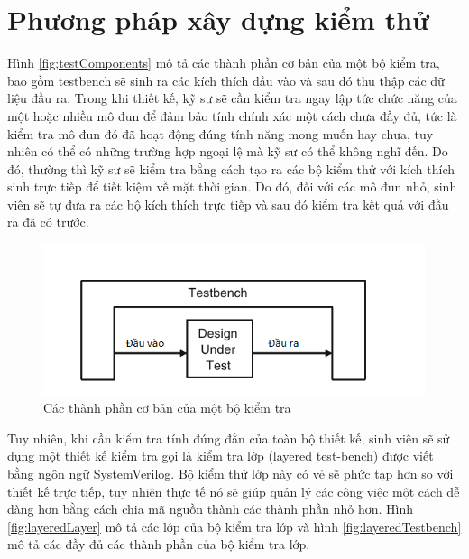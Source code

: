 \section{Phương pháp xây dựng kiểm thử}
Hình \ref{fig;testComponents} mô tả các thành phần cơ bản của một bộ kiểm tra, bao gồm testbench sẽ sinh ra các kích thích đầu vào và sau đó thu thập các dữ liệu đầu ra.
Trong khi thiết kế, kỹ sư sẽ cần kiểm tra ngay lập tức chức năng của một hoặc nhiều mô đun để đảm bảo tính chính xác một cách chưa đầy đủ, tức là kiểm tra mô đun đó đã hoạt động đúng tính năng mong muốn hay chưa, tuy nhiên có thể có những trường hợp ngoại lệ mà kỹ sư có thể không nghĩ đến. Do đó, thường thì kỹ sư sẽ kiểm tra bằng cách tạo ra các bộ kiểm thử với kích thích sinh trực tiếp để tiết kiệm về mặt thời gian. Do đó, đối với các mô đun nhỏ, sinh viên sẽ tự đưa ra các bộ kích thích trực tiếp và sau đó kiểm tra kết quả với đầu ra đã có trước. 

\begin{figure}[!ht]
	\centering
	\includegraphics[width=\linewidth]{figures/testComponents.png}
	\caption{Các thành phần cơ bản của một bộ kiểm tra}
	\label{fig:testComponents}
\end{figure}

Tuy nhiên, khi cần kiểm tra tính đúng đắn của toàn bộ thiết kế, sinh viên sẽ sử dụng một thiết kế kiểm tra gọi là kiểm tra lớp (layered test-bench) được viết bằng ngôn ngữ SystemVerilog. Bộ kiểm thử lớp này có vẻ sẽ phức tạp hơn so với thiết kế trực tiếp, tuy nhiên thực tế nó sẽ giúp quản lý các công việc một cách dễ dàng hơn bằng cách chia mã nguồn thành các thành phần nhỏ hơn. Hình \ref{fig:layeredLayer} mô tả các lớp của bộ kiểm tra lớp và hình \ref{fig:layeredTestbench} mô tả các đầy đủ các thành phần của bộ kiểm tra lớp.

